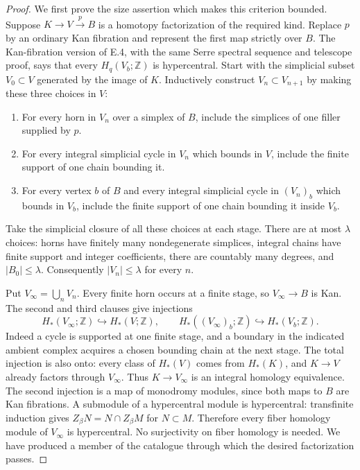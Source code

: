 \begin{proof}
We first prove the size assertion which makes this criterion
bounded. Suppose $K\to V\xrightarrow{p}B$ is a homotopy
factorization of the required kind. Replace $p$ by an ordinary Kan
fibration and represent the first map strictly over $B$. The
Kan-fibration version of E.4, with the same Serre spectral
sequence and telescope proof, says that every
$H_q(V_b;\mathbb Z)$ is hypercentral. Start with the simplicial
subset $V_0\subset V$ generated by the image of $K$. Inductively
construct $V_n\subset V_{n+1}$ by making these three choices in $V$:
\begin{enumerate}
\item For every horn in $V_n$ over a simplex of $B$, include the
simplices of one filler supplied by $p$.
\item For every integral simplicial cycle in $V_n$ which bounds
in $V$, include the finite support of one chain bounding it.
\item For every vertex $b$ of $B$ and every integral simplicial
cycle in $(V_n)_b$ which bounds in $V_b$, include the finite support
of one chain bounding it inside $V_b$.
\end{enumerate}
Take the simplicial closure of all these choices at each stage.
There are at most $\lambda$ choices: horns have finitely many
nondegenerate simplices, integral chains have finite support and
integer coefficients, there are countably many degrees, and
$|B_0|\leq\lambda$. Consequently $|V_n|\leq\lambda$ for every $n$.

Put $V_\infty=\bigcup_nV_n$. Every finite horn occurs at a finite
stage, so $V_\infty\to B$ is Kan. The second and third clauses
give injections
\[
 H_*(V_\infty;\mathbb Z)\hookrightarrow H_*(V;\mathbb Z),
 \qquad
 H_*((V_\infty)_b;\mathbb Z)\hookrightarrow H_*(V_b;\mathbb Z).
                                                               \tag{E.8.6}
\]
Indeed a cycle is supported at one finite stage, and a boundary
in the indicated ambient complex acquires a chosen bounding
chain at the next stage. The total injection is also onto:
every class of $H_*(V)$ comes from $H_*(K)$, and $K\to V$
already factors through $V_\infty$. Thus $K\to V_\infty$ is an
integral homology equivalence. The second injection is a map of
monodromy modules, since both maps to $B$ are Kan fibrations.
A submodule of a hypercentral module is hypercentral: transfinite
induction gives $Z_\beta N=N\cap Z_\beta M$ for $N\subset M$.
Therefore every fiber homology module of $V_\infty$ is
hypercentral. No surjectivity on fiber homology is needed.
We have produced a member of the catalogue through which the
desired factorization passes.


\end{proof}
